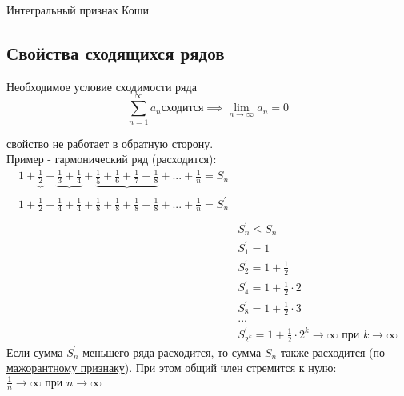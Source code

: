 \begin{priz}
    \label{priz:intcauchy} Интегральный признак Коши \\
\end{priz}

\subsection{Свойства сходящихся рядов}
\begin{sv}
    \label{sv:neob}
    Необходимое условие сходимости ряда
    \begin{equation}
        \sum_{n=1}^{\infty} a_{n} \text{сходится}
        \implies \lim_{n\to\infty} a_{n} = 0
    \end{equation}

    \begin{remark}
        свойство не работает в обратную сторону. \\
        Пример - гармонический ряд (расходится): 
        \begin{equation}
            \begin{align*}
                1 
                + \underbrace{\frac{1}{2}}_{\text{}} 
                + \underbrace{\frac{1}{3} + \frac{1}{4}}_{\text{}} 
                + \underbrace{\frac{1}{5} + \frac{1}{6} + \frac{1}{7} + \frac{1}{8}}_{\text{}}
                + ... 
                + \frac{1}{n}
                = S_{n}
                \\
                1
                + \frac{1}{2}
                + \frac{1}{4} + \frac{1}{4}
                + \frac{1}{8} + \frac{1}{8} + \frac{1}{8} + \frac{1}{8}
                + ... 
                + \frac{1}{n}
                = S^{'}_{n}
                \\
                \\
                &S^{'}_{n} \leq S_{n}\\
                &S^{'}_{1} = 1\\
                &S^{'}_{2} = 1 + \frac{1}{2}\\
                &S^{'}_{4} = 1 + \frac{1}{2}\cdot 2\\
                &S^{'}_{8} = 1 + \frac{1}{2}\cdot 3\\
                &...
                \\
                &S^{'}_{2^{k}} = 1 + \frac{1}{2}\cdot 2^{k} \to\infty \text{ при } k\to\infty
            \end{align*}
        \end{equation}
        Если сумма \(S^{'}_{n}\) меньшего ряда расходится, то сумма \(S_{n}\) также расходится (по \hyperlink{priz:maj}{мажорантному признаку}). 
        При этом общий член стремится к нулю:
        \( \frac{1}{n}\to\infty \text{ при } n\to\infty \)
    \end{remark}
\end{sv}

